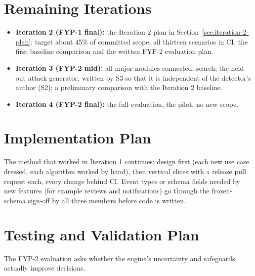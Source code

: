 \section{Remaining Iterations}\label{sec:remaining-iterations}
\begin{itemize}
\item \textbf{Iteration 2 (FYP-1 final):} the Iteration 2 plan in Section~\ref{sec:iteration-2-plan}; target about 45\% of committed scope, all thirteen scenarios in CI, the first baseline comparison and the written FYP-2 evaluation plan.
\item \textbf{Iteration 3 (FYP-2 mid):} all major modules connected; search; the held-out attack generator, written by S3 so that it is independent of the detector's author (S2); a preliminary comparison with the Iteration 2 baseline.
\item \textbf{Iteration 4 (FYP-2 final):} the full evaluation, the pilot, no new scope.
\end{itemize}

\section{Implementation Plan}\label{sec:implementation-plan}
The method that worked in Iteration 1 continues: design first (each new use case dressed, each algorithm worked by hand), then vertical slices with a release pull request each, every change behind CI. Event types or schema fields needed by new features (for example reviews and notifications) go through the frozen-schema sign-off by all three members before code is written.

\section{Testing and Validation Plan}\label{sec:testing-validation-plan}
The FYP-2 evaluation asks whether the engine's uncertainty and safeguards actually improve decisions.

